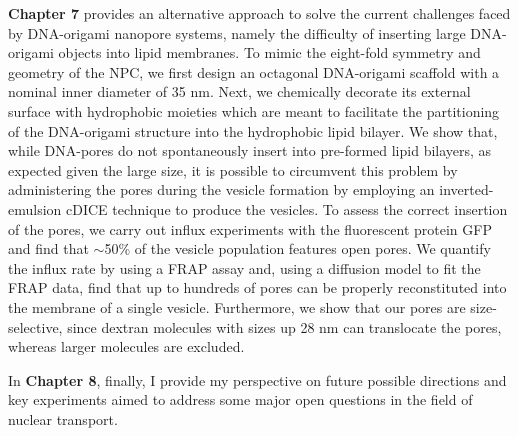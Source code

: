 \noindent \textbf{Chapter 7} provides an alternative approach to solve the current challenges faced by DNA-origami nanopore systems, namely the difficulty of inserting large DNA-origami objects into lipid membranes. To mimic the eight-fold symmetry and geometry of the NPC, we first design an octagonal DNA-origami scaffold with a nominal inner diameter of 35 nm. Next, we chemically decorate its external surface with hydrophobic moieties which are meant to facilitate the partitioning of the DNA-origami structure into the hydrophobic lipid bilayer. We show that, while DNA-pores do not spontaneously insert into pre-formed lipid bilayers, as expected given the large size, it is possible to circumvent this problem by administering the pores during the vesicle formation by employing an inverted-emulsion cDICE technique to produce the vesicles. To assess the correct insertion of the pores, we carry out influx experiments with the fluorescent protein GFP and find that $\sim$50\% of the vesicle population features open pores. We quantify the influx rate by using a FRAP assay and, using a diffusion model to fit the FRAP data, find that up to hundreds of pores can be properly reconstituted into the membrane of a single vesicle. Furthermore, we show that our pores are size-selective, since dextran molecules with sizes up 28 nm can translocate the pores, whereas larger molecules are excluded.

\noindent In \textbf{Chapter 8}, finally, I provide my perspective on future possible directions and key experiments aimed to address some major open questions in the field of nuclear transport.


\newpage




